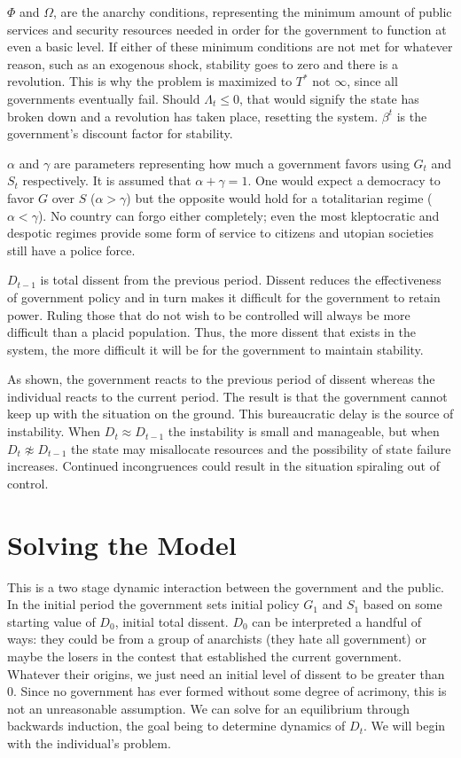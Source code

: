 \documentclass[12pt]{article}
\begin{document}
\begin{spacing}{1.5}
$\Phi$ and $\Omega$, are the anarchy conditions, representing the minimum amount of public services and security resources needed in order for the government to function at even a basic level. If either of these minimum conditions are not met for whatever reason, such as an exogenous shock, stability goes to zero and there is a revolution. This is why the problem is maximized to $T^*$ not $\infty$, since all governments eventually fail. Should $\Lambda_t \leq 0$, that would signify the state has broken down and a revolution has taken place, resetting the system. $\beta^t$ is the government's discount factor for stability. 

$\alpha$ and $\gamma $ are parameters representing how much a government favors using $G_t$ and $S_t$ respectively. It is assumed that $\alpha+\gamma=1$. One would expect a democracy to favor $G$ over $S$ ($\alpha > \gamma$) but the opposite would hold for a totalitarian regime ($\alpha < \gamma $). No country can forgo either completely; even the most kleptocratic and despotic regimes provide some form of service to citizens and utopian societies still have a police force.

$D_{t-1}$ is total dissent from the previous period. Dissent reduces the effectiveness of government policy and in turn makes it difficult for the government to retain power. Ruling those that do not wish to be controlled will always be more difficult than a placid population. Thus, the more dissent that exists in the system, the more difficult it will be for the government to maintain stability.  


As shown, the government reacts to the previous period of dissent whereas the individual reacts to the current period. The result is that the government cannot keep up with the situation on the ground. This bureaucratic delay is the source of instability. When $D_t \approx D_{t-1}$ the instability is small and manageable, but when $D_t \not\approx D_{t-1}$ the state may misallocate resources and the possibility of state failure increases. Continued incongruences could result in the situation spiraling out of control. 

\section{Solving the Model}


This is a two stage dynamic interaction between the government and the public. In the initial period the government sets initial policy $G_1$ and $S_1$ based on some starting value of $D_0$, initial total dissent. $D_0$ can be interpreted a handful of ways: they could be from a group of anarchists (they hate all government) or maybe the losers in the contest that established the current government. Whatever their origins, we just need an initial level of dissent to be greater than 0. Since no government has ever formed without some degree of acrimony, this is not an unreasonable assumption. We can solve for an equilibrium through backwards induction, the goal being to determine dynamics of $D_t$. We will begin with the individual's problem. 


\end{spacing}
\end{document}
